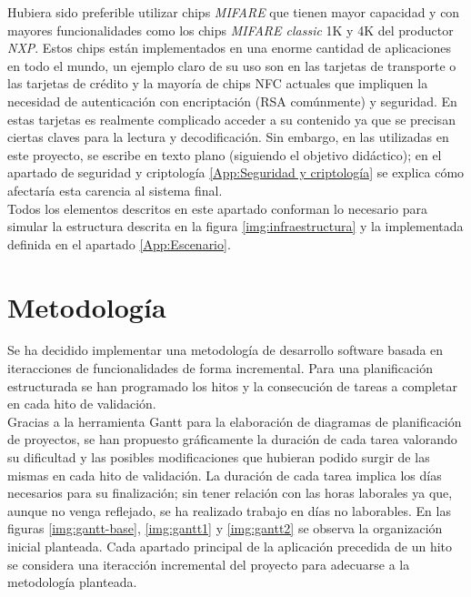 \documentclass[../PFC.tex]{subfiles}
\begin{document}
Hubiera sido preferible utilizar chips \textit{MIFARE}\cite{mifare} que tienen mayor capacidad y con mayores funcionalidades como los chips \textit{MIFARE classic} 1K y 4K del productor \textit{NXP}. Estos chips están implementados en una enorme cantidad de aplicaciones en todo el mundo, un ejemplo claro de su uso son en las tarjetas de transporte o las tarjetas de crédito y la mayoría de chips NFC actuales que impliquen la necesidad de autenticación con encriptación (RSA comúnmente) y seguridad. En estas tarjetas es realmente complicado acceder a su contenido ya que se precisan ciertas claves para la lectura y decodificación. Sin embargo, en las utilizadas en este proyecto, se escribe en texto plano (siguiendo el objetivo didáctico); en el apartado de seguridad y criptología \ref{App:Seguridad y criptología} se explica cómo afectaría esta carencia al sistema final. 
\*
\vspace{0.5515cm}
\\
Todos los elementos descritos en este apartado conforman lo necesario para simular la estructura descrita en la figura \ref{img:infraestructura} y la implementada definida en el apartado \ref{App:Escenario}. 

\section{Metodología}
\label{App:Metodología}

Se ha decidido implementar una metodología de desarrollo software basada en iteracciones de funcionalidades de forma incremental. Para una planificación estructurada se han programado los hitos y la consecución de tareas a completar en cada hito de validación.
\*
\vspace{0.5515cm}
\\
Gracias a la herramienta Gantt\cite{gantt} para la elaboración de diagramas de planificación de proyectos, se han propuesto gráficamente la duración de cada tarea valorando su dificultad y las posibles modificaciones que hubieran podido surgir de las mismas en cada hito de validación. La duración de cada tarea implica los días necesarios para su finalización; sin tener relación con las horas laborales ya que, aunque no venga reflejado, se ha realizado trabajo en días no laborables. En las figuras \ref{img:gantt-base}, \ref{img:gantt1} y \ref{img:gantt2} se observa la organización inicial planteada. Cada apartado principal de la aplicación precedida de un hito se considera una iteracción incremental del proyecto para adecuarse a la metodología planteada.
\end{document}
